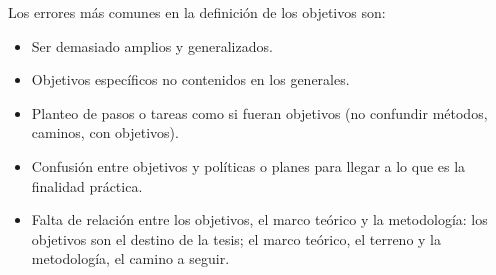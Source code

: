 Los errores más comunes en la definición de los objetivos son:
\begin{itemize}
    \item Ser demasiado amplios y generalizados.
    \item Objetivos específicos no contenidos en los generales.
    \item Planteo de pasos o tareas como si fueran objetivos (no confundir métodos, caminos, con objetivos).
    \item Confusión entre objetivos y políticas o planes para llegar a lo que es la finalidad práctica.
    \item Falta de relación entre los objetivos, el marco teórico y la metodología: los objetivos son el destino de la tesis; el marco teórico, el terreno y la metodología, el camino a seguir.
\end{itemize}